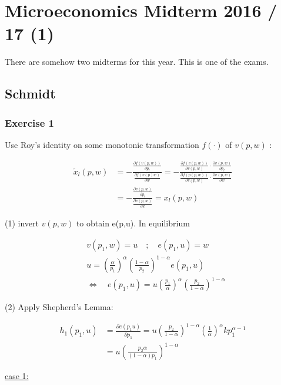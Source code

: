 \section*{Microeconomics Midterm 2016 / 17 (1)}

There are somehow two midterms for this year. This is one of the exams.

{
\subsection*{Schmidt}

\subsubsection*{Exercise 1}

\begin{enumerate}[label=(\alph*)]
{\item 
Use Roy's identity on some monotonic transformation $f(\cdot)$ of $v(p, w)$ :

$$
\begin{aligned}
\tilde{x}_{l}(p, w) & =-\frac{\frac{\partial f(v(p, w))}{\partial p_{l}}}{\frac{\partial f(v(p) w)}{\partial w}}=-\frac{\frac{\partial f(v(p, w))}{\partial v(p, w)} \cdot \frac{\partial v(p, w)}{\partial p_{l}}}{\frac{\partial f(p(p, w))}{\partial v(p, w)} \cdot \frac{\partial v(p, w)}{\partial w}} \\
& =-\frac{\frac{\partial v(p, w)}{\partial p_{l}}}{\frac{\partial v(p, w)}{\partial w}}=x_{l}(p, w)
\end{aligned}
$$
}
{\item 
(1) invert $v(p, w)$ to obtain e(p,u). In equilibrium

$$
\begin{aligned}
& v\left(p_{1}, w\right)=u \quad ; \quad e\left(p_{1}, u\right)=w \\
& u=\left(\frac{\alpha}{p_{1}}\right)^{\alpha}\left(\frac{1-\alpha}{p_{2}}\right)^{1-\alpha} e\left(p_{1}, u\right) \\
& \Leftrightarrow \quad e\left(p_{1}, u\right)=u\left(\frac{p_{1}}{\alpha}\right)^{\alpha}\left(\frac{p_{2}}{1-\alpha}\right)^{1-\alpha}
\end{aligned}
$$

(2) Apply Shepherd's Lemma:

$$
\begin{aligned}
h_{1}\left(p_{1}, u\right) & =\frac{\partial e\left(p_{1} u\right)}{\partial p_{1}}=u\left(\frac{p_{2}}{1-\alpha}\right)^{1-\alpha}\left(\frac{1}{\alpha}\right)^{\alpha} k p_{1}^{\alpha-1} \\
& =u\left(\frac{p_{2} \alpha}{(1-\alpha) p_{1}}\right)^{1-\alpha}
\end{aligned}
$$
}
{\item 
\underline{case 1:}

}
\end{enumerate}}
